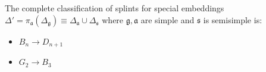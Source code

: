 \documentclass[12pt]{article}
\newcommand{\pia}{\pi_{\mathfrak{a}}}
\newcommand{\gf}{\mathfrak{g}}
\newcommand{\af}{\mathfrak{a}}
\newcommand{\sfr}{\mathfrak{s}}
\begin{document}


The complete classification of splints for special embeddings $\Delta'=\pia(\Delta_{\gf})
\equiv \Delta_{\af}\cup \Delta_{\sfr}$ where $\gf, \af$ are simple and $\sfr$ is semisimple is:
\begin{itemize}
\item $B_{n}\to D_{n+1}$
\item $G_{2}\to B_{3}$
\end{itemize}
\end{document}
